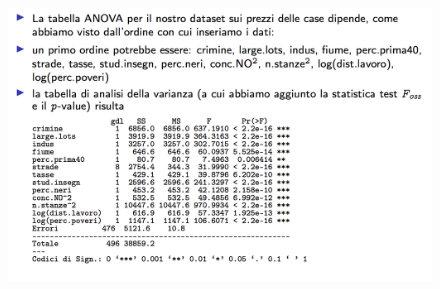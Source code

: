 \begin{figure}[htbp]
	\centering
	\includegraphics[width=.7\textwidth]{./notes/immagini/l10-fig4.png}
\end{figure}




